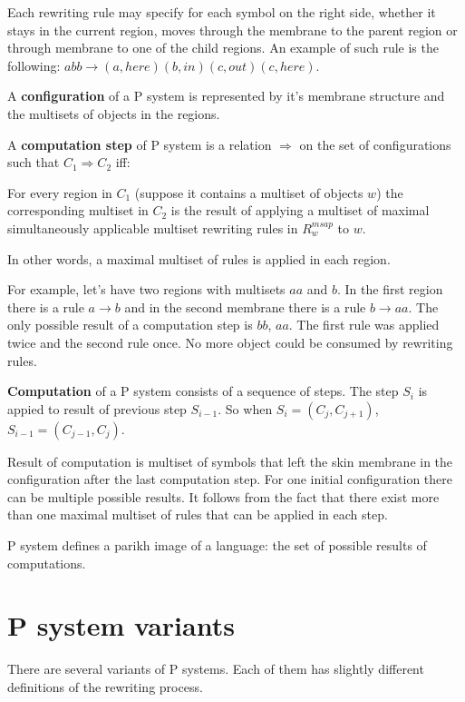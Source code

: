 \documentclass[a4paper,10pt]{article}
\begin{document}
Each rewriting rule may specify for each symbol on the right side, whether it stays in the current region, moves through the membrane to the parent region or through membrane to one of the child regions. An example of such rule is the following: $abb\rightarrow (a,here)(b,in)(c,out)(c,here)$.


A {\bf configuration} of a P system is represented by it's membrane structure and the multisets of objects in the regions.


A {\bf computation step} of P system is a relation $\Rightarrow$ on the set of configurations such that $C_1 \Rightarrow C_2$ iff:

For every region in $C_1$ (suppose it contains a multiset of objects $w$) the corresponding multiset in $C_2$ is the result of applying a multiset of maximal simultaneously applicable multiset rewriting rules in $R^{msap}_w$ to $w$.

In other words, a maximal multiset of rules is applied in each region.

For example, let's have two regions with multisets $aa$ and $b$. In the first region there is a rule $a\rightarrow b$ and in the second membrane there is a rule $b\rightarrow aa$. The only possible result of a computation step is $bb$, $aa$. The first rule was applied twice and the second rule once. No more object could be consumed by rewriting rules.


{\bf Computation} of a P system consists of a sequence of steps. The step $S_i$ is appied to result of previous step $S_{i-1}$. So when $S_i = (C_j,C_{j+1})$, $S_{i-1} = (C_{j-1},C_j)$.

Result of computation is multiset of symbols that left the skin membrane in the configuration after the last computation step. For one initial configuration there can be multiple possible results. It follows from the fact that there exist more than one maximal multiset of rules that can be applied in each step.

P system defines a parikh image of a language: the set of possible results of computations.

\section{P system variants}

There are several variants of P systems. Each of them has slightly different definitions of the rewriting process.
\end{document}
